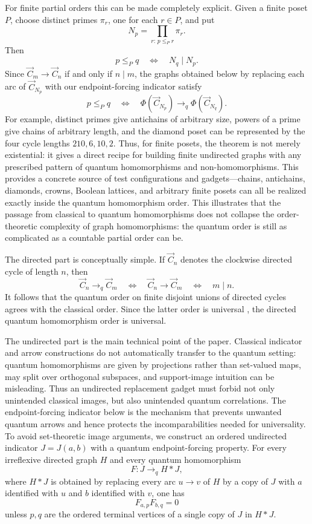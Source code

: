 \documentclass[11pt]{amsart}
\theoremstyle{plain}
\theoremstyle{definition}
\newcommand{\toq}{\to_q}
\newcommand{\Cyc}{\overrightarrow{C}}
\begin{document}
For finite partial orders this can be made completely explicit.  Given a finite poset $P$, choose distinct primes $\pi_r$, one for each $r\in P$, and put
\[
   N_p=\prod_{r:\,p\le_P r}\pi_r.
\]
Then
\[
   p\le_P q
   \quad\Longleftrightarrow\quad
   N_q\mid N_p.
\]
Since $\Cyc_m\to\Cyc_n$ if and only if $n\mid m$, the graphs obtained below by replacing each arc of $\Cyc_{N_p}$ with our endpoint-forcing indicator satisfy
\[
   p\le_P q
   \quad\Longleftrightarrow\quad
   \Phi(\Cyc_{N_p})\toq \Phi(\Cyc_{N_q}).
\]
For example, distinct primes give antichains of arbitrary size, powers of a prime give chains of arbitrary length, and the diamond poset can be represented by the four cycle lengths $210,6,10,2$.  Thus, for finite posets, the theorem is not merely existential: it gives a direct recipe for building finite undirected graphs with any prescribed pattern of quantum homomorphisms and non-homomorphisms.  This provides a concrete source of test configurations and gadgets---chains, antichains, diamonds, crowns, Boolean lattices, and arbitrary finite posets can all be realized exactly inside the quantum homomorphism order.  This illustrates that the passage from classical to quantum homomorphisms does not collapse the order-theoretic complexity of graph homomorphisms: the quantum order is still as complicated as a countable partial order can be.

The directed part is conceptually simple.  If $\Cyc_n$ denotes the clockwise directed cycle of length $n$, then
\[
   \Cyc_n\toq \Cyc_m
   \quad\Longleftrightarrow\quad
   \Cyc_n\to \Cyc_m
   \quad\Longleftrightarrow\quad
   m\mid n.
\]
It follows that the quantum order on finite disjoint unions of directed cycles agrees with the classical order.  Since the latter order is universal \cite{FialaHubickaLong}, the directed quantum homomorphism order is universal.

The undirected part is the main technical point of the paper.  Classical indicator and arrow constructions do not automatically transfer to the quantum setting: quantum homomorphisms are given by projections rather than set-valued maps, may split over orthogonal subspaces, and support-image intuition can be misleading.  Thus an undirected replacement gadget must forbid not only unintended classical images, but also unintended quantum correlations.  The endpoint-forcing indicator below is the mechanism that prevents unwanted quantum arrows and hence protects the incomparabilities needed for universality.  To avoid set-theoretic image arguments, we construct an ordered undirected indicator $J=J(a,b)$ with a quantum endpoint-forcing property.  For every irreflexive directed graph $H$ and every quantum homomorphism
\[
   F:J\toq H*J,
\]
where $H*J$ is obtained by replacing every arc $u\to v$ of $H$ by a copy of $J$ with $a$ identified with $u$ and $b$ identified with $v$, one has
\[
   F_{a,p}F_{b,q}=0
\]
unless $p,q$ are the ordered terminal vertices of a single copy of $J$ in $H*J$.
\end{document}
